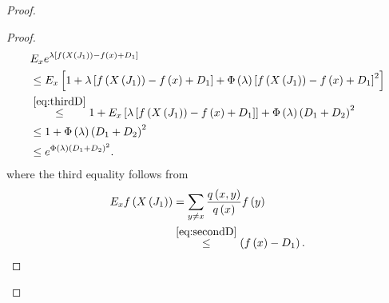 \documentclass[12pt,a4paper]{scrartcl}
\numberwithin{equation}{section}
\begin{document}
\begin{proof}
\begin{proof}
\begin{align*}
&E_x e^{\lambda \left[f\left(X\left(J_1\right) \right) -  f\left(x\right) + D_1 \right]} \\
&\leq E_x \left[ 1 + \lambda \left[f\left(X\left(J_1\right) \right) - f\left(x\right) + D_1 \right] + \Phi\left(\lambda\right)\left[f\left(X\left(J_1\right) \right) - f\left(x\right) + D_1 \right]^2\right] \\
&\overset{ \eqref{eq:thirdD}}{\leq} 1 + E_x \left[ \lambda \left[f\left(X\left(J_1\right) \right) - f\left(x\right) + D_1 \right] \right] + \Phi\left(\lambda\right) \left(D_1 + D_2\right)^2 \\
& \leq 1 + \Phi\left(\lambda\right) \left(D_1 + D_2\right)^2 \\
& \leq e^{\Phi\left(\lambda\right) \left(D_1 + D_2\right)^2 }.
\end{align*}
where the third equality follows from
\begin{align*}
E_x f\left(X\left(J_1\right) \right) &= \sum_{y \neq x} \frac{q\left(x,y\right)}{q\left(x\right)} f\left(y\right) \\
&\overset{\eqref{eq:secondD}}{\leq} \left(f\left(x\right) - D_1\right).
\end{align*}


\end{proof}
\end{proof}
\end{document}
